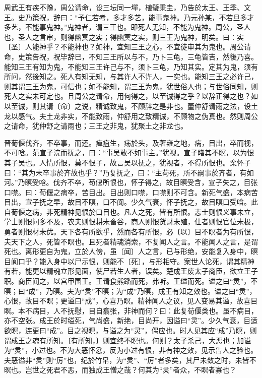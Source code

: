 \documentclass[]{article}
\begin{document}
周武王有疾不豫，周公请命，设三坛同一墠，植璧秉圭，乃告於太王、王季、文王。史乃策祝，辞曰：``予仁若考，多才多艺，能事鬼神。乃元孙某，不若旦多才多艺，不能事鬼神。''鬼神者，谓三王也。即死人无知，不能为鬼神。周公，圣人也，圣人之言审，则得幽冥之实；得幽冥之实，则三王为鬼神，明矣。曰：实〔圣〕人能神乎？不能神也？如神，宜知三王之心，不宜徒审其为鬼也。周公请命，史策告祝，祝毕辞已，不知三王所以与不，乃卜三龟，三龟皆吉，然後乃喜。能知三王有知为鬼，不能知三王许己与不，须卜三龟，乃知其实。定其为鬼，须有所问，然後知之。死人有知无知，与其许人不许人，一实也。能知三王之必许己，则其谓三王为鬼，可信也；如不能知，谓三王为鬼，犹世俗人也；与世俗同知，则死人之实未可定也。且周公之请命，用何得之，以至诚得之乎？以辞正得之也？如以至诚，则其请〔命〕之说，精诚致鬼，不顾辞之是非也。董仲舒请雨之法，设土龙以感气。夫土龙非实，不能致雨，仲舒用之致精诚，不顾物之伪真也。然则周公之请命，犹仲舒之请雨也；三王之非鬼，犹聚土之非龙也。

晋荀偃伐齐，不卒事，而还。瘅疽生，疡於头，及著雍之地，病，目出，卒而视，不可唅。范宣子浣而抚之，曰：``事吴敢不如事主。''犹视。宣子睹其不瞑，以为恨其子吴也。人情所恨，莫不恨子，故言吴以抚之，犹视者，不得所恨也。栾怀子曰：``其为未卒事於齐故也乎？''乃复抚之，曰：``主苟死，所不嗣事於齐者，有如河。''乃瞑受唅。伐齐不卒，苟偃所恨也，怀子得之，故目瞑受含，宣子失之，目张口噤。曰：荀偃之病卒，苦目出。目出则口噤，口噤则不可含。新死气盛，本病苦目出，宣子抚之早，故目不瞑，口不阆。少久气衰，怀子抚之，故目瞑口受唅。此自荀偃之病，非死精神见恨於口目也。凡人之死，皆有所恨。志士则恨义事未立，学士则恨问多不及，农夫则恨耕未畜谷，商人则恨货财未殖，仕者则恨官位未极，勇者则恨材未优。天下各有所欲乎，然而各有所恨，必〔以〕目不瞑者为有所恨，夫天下之人，死皆不瞑也。且死者精魂消索，不复闻人之言。不能闻人之言，是谓死也。离形更自为鬼，立於人傍，虽〔闻〕人之言，已与形绝，安能复入身中，瞑目阆口乎？能入身中以尸示恨，则能不〔死〕，与形相守。案世人论死，谓其精神有若，能更以精魂立形见面，使尸若生人者，误矣。楚成王废太子商臣，欲立王子职。商臣闻之，以宫甲围王。王请食熊蹯而死，弗听。王缢而死。谥之曰``灵''，不瞑；曰``成''，乃瞑。夫为``灵''不瞑；为``成''乃瞑，成王有知之效也。谥之曰``灵''，心恨，故目不瞑；更谥曰``成''，心喜乃瞑。精神闻人之议，见人变易其谥，故喜目瞑。本不病目，人不抚慰，目自翕张，非神而何？曰：此复荀偃类也。虽不病目，亦不空张。成王於时缢死，气尚盛，新绝，目尚开，因谥曰``灵''。少久气衰，目适欲瞑，连更曰``成''。目之视瞑，与谥之为``灵''，偶应也。时人见其应``成''乃瞑，则谓成王之魂有所知。〔有所知，〕则宜终不瞑也。何则？太子杀己，大恶也；加谥为``灵''，小过也。不为大恶怀忿，反为小过有恨，非有神之效，见示告人之验也。夫恶谥非``灵''则``厉''也，纪於竹帛，为``灵''、``厉''者多矣，其尸未敛之时，未皆不暝也。岂世之死君不恶，而独成王憎之哉？何其为``灵''者众，不瞑者寡也？
\end{document}
